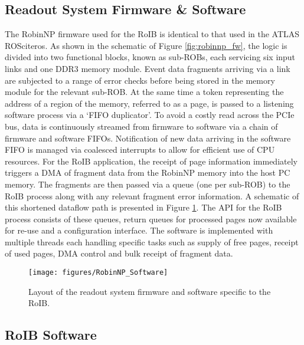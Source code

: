\subsection{Readout System Firmware \& Software}\label{sec:crorc_fw}

The RobinNP firmware used for the RoIB is identical to that used in the ATLAS ROScite{ros}. As shown in 
the schematic of Figure \ref{fig:robinnp_fw}, the logic is divided into two functional blocks, known as sub-ROBs, 
each servicing six input links and one DDR3 memory module. Event data fragments arriving via a link are subjected 
to a range of error checks before being stored in the memory module for the relevant sub-ROB. At the same time a token
representing the address of a region of the memory, referred to as a page, is passed to a listening software process via 
a `FIFO duplicator'. To avoid a costly read across the PCIe bus, data is continuously streamed from firmware to 
software via a chain of firmware and software FIFOs. Notification of new data arriving in the software FIFO is managed via coalesced 
interrupts to allow for efficient use of CPU resources.
For the RoIB application, the receipt of page information immediately triggers a DMA of fragment data from the RobinNP memory into 
the host PC memory. The fragments are then passed via a queue (one per sub-ROB) to the RoIB process along with any relevant fragment 
error information. A schematic of this shortened dataflow path is presented in Figure \ref{fig:roib_swfw}. 
The API for the RoIB process consists of these queues, return queues for processed pages now available for re-use and 
a configuration interface. The software is implemented with multiple threads each handling specific tasks such as supply of free pages, receipt
of used pages, DMA control and bulk receipt of fragment data.


\begin{figure}[tbp] %
\centering
\texttt{[image: figures/RobinNP\_Software]}
\caption{Layout of the readout system firmware and software specific to the RoIB.}
\label{fig:roib_swfw}
\end{figure}

\subsection{RoIB Software}\label{sec:crorc_sw}

